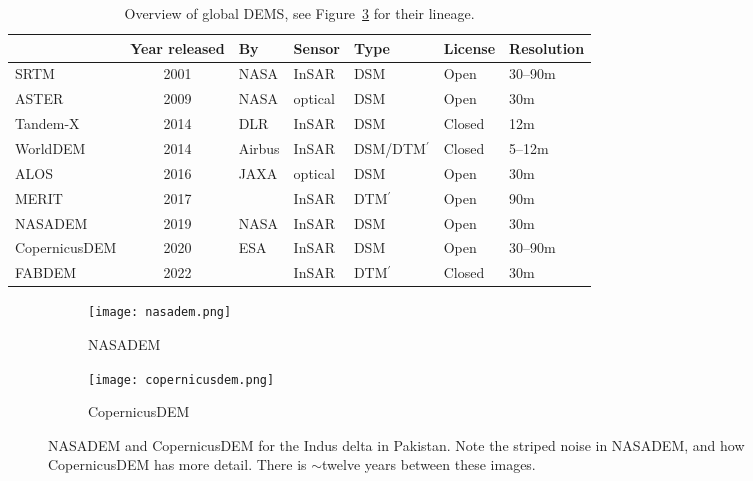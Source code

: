 \begin{table}[]
  \begin{tabular}{@{}lclllll@{}}
    \toprule
                  & Year released & By                 & Sensor  & Type               & License & Resolution \\
    \midrule
    SRTM          & 2001          & NASA               & InSAR   & DSM                & Open    & 30--90m    \\
    ASTER         & 2009          & NASA               & optical & DSM                & Open    & 30m        \\
    Tandem-X      & 2014          & DLR                & InSAR   & DSM                & Closed  & 12m        \\
    WorldDEM      & 2014          & Airbus             & InSAR   & DSM/DTM$^{\prime}$ & Closed  & 5--12m     \\
    ALOS          & 2016          & JAXA               & optical & DSM                & Open    & 30m        \\
    MERIT         & 2017          & \citet{Yamazaki17} & InSAR   & DTM$^{\prime}$     & Open    & 90m        \\
    NASADEM       & 2019          & NASA               & InSAR   & DSM                & Open    & 30m        \\
    CopernicusDEM & 2020          & ESA                & InSAR   & DSM                & Open    & 30--90m    \\
    FABDEM        & 2022          & \citet{Hawker22}   & InSAR   & DTM$^{\prime}$     & Closed  & 30m        \\
    \bottomrule
  \end{tabular}
  \caption{Overview of global DEMS, see Figure~\ref{fig:dem_comparison} for their lineage.}%
  \label{tab:gdem_overview}
\end{table}


\begin{figure}
  \centering
  \begin{subfigure}[t]
    {0.45\linewidth}
    \texttt{[image: nasadem.png]}
    \caption{NASADEM}\label{fig:nasadem}
  \end{subfigure}
  \qquad
  \begin{subfigure}[t]
    {0.45\linewidth}
    \texttt{[image: copernicusdem.png]}
    \caption{CopernicusDEM}\label{fig:copernicusdem}
  \end{subfigure}
  \caption{NASADEM and CopernicusDEM for the Indus delta in Pakistan. Note the striped noise in NASADEM, and how CopernicusDEM has more detail. There is $\sim$twelve years between these images.}%
  \label{fig:dem_comparison}
\end{figure}





